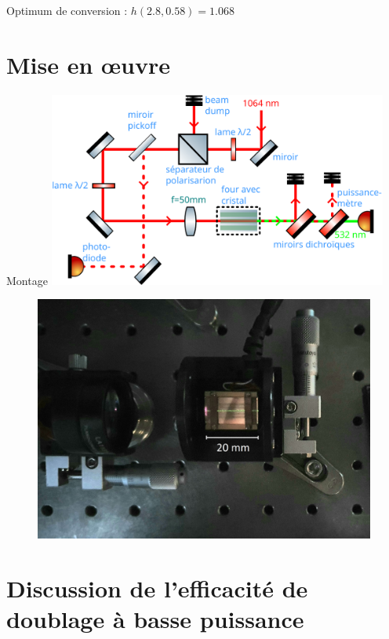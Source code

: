 \documentclass{beamer}
\newcommand{\lmbd}[1]{\SI{#1}{\nano\metre}}
\begin{document}
\begin{frame}{Optimum de conversion : $h(2.8,0.58)=1.068$}
\centering

\end{frame}

\section{Mise en \oe uvre}

\begin{frame}{Montage}
\centering
\includegraphics[height=6.4cm]{img/schema.pdf}
\end{frame}

\begin{frame}
\begin{figure}[htbp]
  \centering
  \includegraphics[width=0.7\linewidth]{img/cristal clair.jpg}
\end{figure}
\end{frame}

\section{Discussion de l'efficacité de doublage à basse puissance}
\end{document}
